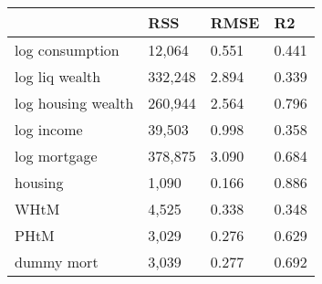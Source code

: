 \begin{table}[htbp]
\centering\medskip
\begin{tabular}{llll} \hline \hline
 & RSS  & RMSE  & R2  \\  \hline 
log consumption &    12,064 &     0.551 &     0.441 \\  
log liq wealth &   332,248 &     2.894 &     0.339 \\  
log housing wealth &   260,944 &     2.564 &     0.796 \\  
log income &    39,503 &     0.998 &     0.358 \\  
log mortgage &   378,875 &     3.090 &     0.684 \\  
housing &     1,090 &     0.166 &     0.886 \\  
WHtM &     4,525 &     0.338 &     0.348 \\  
PHtM &     3,029 &     0.276 &     0.629 \\  
dummy mort &     3,039 &     0.277 &     0.692 \\  
\hline \hline \end{tabular}
\end{table}
